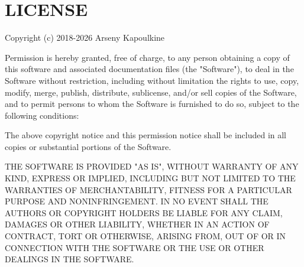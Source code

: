 \chapter{LICENSE }
\hypertarget{md__mono_engine_2thirdparty_2volk_2_l_i_c_e_n_s_e}{}\label{md__mono_engine_2thirdparty_2volk_2_l_i_c_e_n_s_e}
Copyright (c) 2018-\/2026 Arseny Kapoulkine

Permission is hereby granted, free of charge, to any person obtaining a copy of this software and associated documentation files (the "{}\+Software"{}), to deal in the Software without restriction, including without limitation the rights to use, copy, modify, merge, publish, distribute, sublicense, and/\+or sell copies of the Software, and to permit persons to whom the Software is furnished to do so, subject to the following conditions:\+

The above copyright notice and this permission notice shall be included in all copies or substantial portions of the Software.

THE SOFTWARE IS PROVIDED "{}\+AS IS"{}, WITHOUT WARRANTY OF ANY KIND, EXPRESS OR IMPLIED, INCLUDING BUT NOT LIMITED TO THE WARRANTIES OF MERCHANTABILITY, FITNESS FOR A PARTICULAR PURPOSE AND NONINFRINGEMENT. IN NO EVENT SHALL THE AUTHORS OR COPYRIGHT HOLDERS BE LIABLE FOR ANY CLAIM, DAMAGES OR OTHER LIABILITY, WHETHER IN AN ACTION OF CONTRACT, TORT OR OTHERWISE, ARISING FROM, OUT OF OR IN CONNECTION WITH THE SOFTWARE OR THE USE OR OTHER DEALINGS IN THE SOFTWARE. 